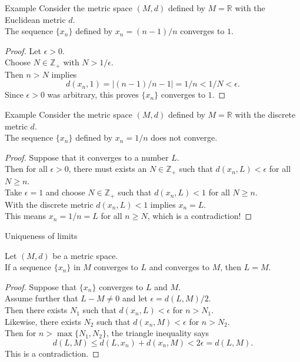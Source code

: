 \documentclass{beamer}
\begin{document}
\begin{frame}{Example}
Consider the metric space $(M,d)$ defined by $M=\mathbb{R}$ with the Euclidean metric $d$.\\
\pause
The sequence $\{x_n\}$ defined by $x_n = (n-1)/n$ converges to $1$.\\
\pause
\begin{proof}
\pause
Let $\epsilon > 0$.\\
\pause
Choose $N\in\mathbb{Z}_+$ with $N > 1/\epsilon$.\\
\pause
Then $n>N$ implies
$$d(x_n,1) = |(n-1)/n-1| = 1/n < 1/N < \epsilon.$$
\pause
Since $\epsilon > 0$ was arbitrary, this proves $\{x_n\}$ converges to $1$.
\end{proof}
\end{frame}

\begin{frame}{Example}
Consider the metric space $(M,d)$ defined by $M=\mathbb{R}$ with the {\color{red} discrete} metric $d$.\\
\pause
The sequence $\{x_n\}$ defined by $x_n = 1/n$ does not converge.\\
\pause
\begin{proof}
\pause
Suppose that it converges to a number $L$.\\
\pause
Then for all $\epsilon > 0$, there must exists an $N\in\mathbb{Z}_+$ such that $d(x_n,L) < \epsilon$ for all $N\geq n$.\\
\pause
Take $\epsilon = 1$ and choose $N\in\mathbb{Z}_+$ such that $d(x_n,L) < 1$ for all $N\geq n$.\\
\pause
With the discrete metric $d(x_n,L) < 1$ implies $x_n = L$.\\
\pause
This means $x_n=1/n = L$ for all $n\geq N$, which is a contradiction!
\end{proof}
\end{frame}

\begin{frame}{Uniqueness of limits}
\begin{thm}
\pause
Let $(M,d)$ be a metric space.\\
\pause
If a sequence $\{x_n\}$ in $M$ converges to $L$ and converges to $M$, then $L=M$.
\end{thm}
\pause
\begin{proof}
\pause
Suppose that $\{x_n\}$ converges to $L$ and $M$.\\
\pause
Assume further that $L-M\neq 0$ and let $\epsilon = d(L,M)/2$.\\
\pause
Then there exists $N_1$ such that $d(x_n,L) < \epsilon$ for $n > N_1$.\\
\pause
Likewise, there exists $N_2$ such that $d(x_n,M) < \epsilon$ for $n > N_2$.\\
\pause
Then for $n>\max\{N_1,N_2\}$,  the triangle inequality says
\pause
$$d(L,M) \leq d(L,x_n) + d(x_n,M) < 2\epsilon = d(L,M).$$
\pause
This is a contradiction.
\end{proof}
\end{frame}
\end{document}
